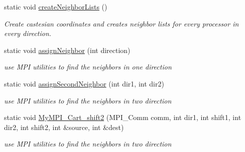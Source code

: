 \begin{DoxyCompactItemize}
\item 
static void \hyperlink{classParallel_a0bc2faea05d1a899d71fa5a29c13cd4a}{create\+Neighbor\+Lists} ()\hypertarget{classParallel_a0bc2faea05d1a899d71fa5a29c13cd4a}{}\label{classParallel_a0bc2faea05d1a899d71fa5a29c13cd4a}

\begin{DoxyCompactList}\small\item\em Create castesian coordinates and creates neighbor lists for every processor in every direction. \end{DoxyCompactList}\item 
static void \hyperlink{classParallel_a246c14b38e3852f2f97458634cd01391}{assign\+Neighbor} (int direction)\hypertarget{classParallel_a246c14b38e3852f2f97458634cd01391}{}\label{classParallel_a246c14b38e3852f2f97458634cd01391}

\begin{DoxyCompactList}\small\item\em use M\+PI utilities to find the neighbors in one direction \end{DoxyCompactList}\item 
static void \hyperlink{classParallel_a14545f7fc9d73b2a5decd609585ef6ea}{assign\+Second\+Neighbor} (int dir1, int dir2)\hypertarget{classParallel_a14545f7fc9d73b2a5decd609585ef6ea}{}\label{classParallel_a14545f7fc9d73b2a5decd609585ef6ea}

\begin{DoxyCompactList}\small\item\em use M\+PI utilities to find the neighbors in two direction \end{DoxyCompactList}\item 
static void \hyperlink{classParallel_a5a5e5ad59586bb545aa3840991b20af8}{My\+M\+P\+I\+\_\+\+Cart\+\_\+shift2} (M\+P\+I\+\_\+\+Comm comm, int dir1, int shift1, int dir2, int shift2, int \&source, int \&dest)\hypertarget{classParallel_a5a5e5ad59586bb545aa3840991b20af8}{}\label{classParallel_a5a5e5ad59586bb545aa3840991b20af8}

\begin{DoxyCompactList}\small\item\em use M\+PI utilities to find the neighbors in two direction \end{DoxyCompactList}\end{DoxyCompactItemize}
